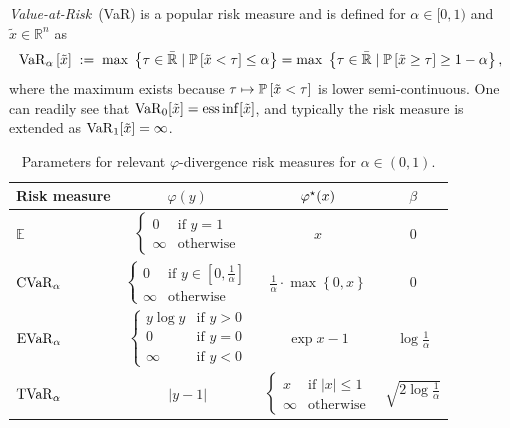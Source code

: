 \documentclass[10pt]{article} %
\DeclareMathOperator{\ess}{ess}
\renewcommand{\cite}{\citep}
\begin{document}
\emph{Value-at-Risk}~(VaR) is a popular risk measure and is defined for $\alpha\in [0,1)$ and $\tilde{x}\in \mathbb{R}^n$ as~\cite{Follmer2016,Shapiro2014}
\begin{equation}
  \label{eq:var-definition}
  \var{\alpha}{ \tilde{x} }
  \;:=\;
    \max\; \left\{\tau \in \bar{\Real} \mid \P{\tilde{x} < \tau}  \le \alpha\right\} =
    \max\; \left\{\tau \in \bar{\Real} \mid \P{\tilde{x} \ge  \tau}  \ge 1 - \alpha\right\},
\end{equation}
where the maximum exists because $\tau \mapsto \P{\tilde{x} < \tau}$ is lower semi-continuous. One can readily see that $\varo_0[\tilde{x}] = \ess \inf [\tilde{x}]$, and typically the risk measure is extended as $\varo_{1}[ \tilde{x} ] = \infty$.

\begin{table}
    \caption{Parameters for relevant $\varphi$-divergence risk measures for $\alpha\in (0,1)$.} \label{tab:phi-divergence-risk}
    \centering
    \begin{tabular}{l|c|c|c}
         \toprule
         Risk measure & $\varphi(y)$  & $\varphi\opt(x)$ & $\beta$ \\
         \midrule        
         $\mathbb{E}$           & $\begin{cases} 0 &\text{if } y = 1 \\ \infty & \text{otherwise}  \end{cases}$ & $x$ & $0$  \\
      \midrule
      $\cvaro_{\alpha}$     & $\begin{cases} 0 &\text{if } y \in [0, \frac{1}{\alpha}] \\ \infty & \text{otherwise}  \end{cases}$ & $\frac{1}{\alpha} \cdot \max \left\{ 0,  x \right\} $& $0$ \\
      \midrule
      $\evaro_{\alpha}$     & $\begin{cases} y \log y &\text{if } y > 0 \\ 0 &\text{if } y =  0 \\  \infty &\text{if } y < 0 \end{cases}$ & $\exp{ x - 1 }$ & $\log \frac{1}{\alpha}$ \\
      \midrule
         $\tvaro_{\alpha}$     & $|y - 1|$ & $ \begin{cases} x &\text{if } |x| \le 1\\ \infty &\text{otherwise} \end{cases} $& $\sqrt{ 2 \log \frac{1}{\alpha} }$ \\
         \bottomrule
    \end{tabular}
\end{table}
\end{document}
